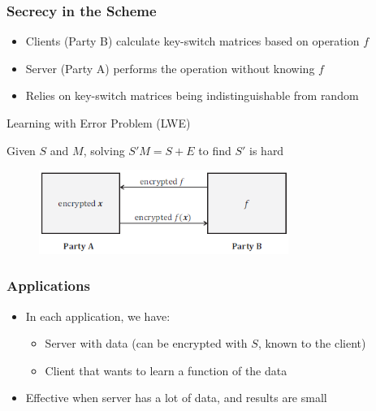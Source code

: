 \documentclass{beamer}
\newcommand{\itz}[1]{\begin{itemize}#1\end{itemize}} %
\begin{document}
\begin{frame}
\frametitle{Secrecy in the Scheme}

\itz{
\item{ Clients (Party B) calculate key-switch matrices based on operation $f$}
\item{ Server (Party A) performs the operation without knowing $f$}
\item{ Relies on key-switch matrices being indistinguishable from random}

}
	
\begin{block}{Learning with Error Problem (LWE)}
\begin{center}
Given $S$ and $M$, solving $S'M = S + E$ to find $S'$ is hard
\end{center}
\end{block}

\vspace{.07in}
\begin{figure}[ht]
\centering
\includegraphics[width=3.2in]{eve}
\end{figure}
\end{frame}



\begin{frame}
\frametitle{Applications}

\itz{
\item{In each application, we have:
 \itz{
 	\item{Server with data (can be encrypted with $S$, known to the client)}
 	\item{Client that wants to learn a function of the data}
 	}
 }
\vspace{.15in}
\item{Effective when server has a lot of data, and results are small}
}
\end{frame}
\end{document}
